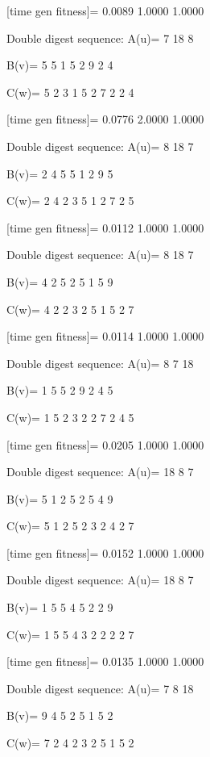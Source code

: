 [time gen fitness]=
    0.0089    1.0000    1.0000

Double digest sequence:
A(u)=
     7    18     8

B(v)=
     5     5     1     5     2     9     2     4

C(w)=
     5     2     3     1     5     2     7     2     2     4

[time gen fitness]=
    0.0776    2.0000    1.0000

Double digest sequence:
A(u)=
     8    18     7

B(v)=
     2     4     5     5     1     2     9     5

C(w)=
     2     4     2     3     5     1     2     7     2     5

[time gen fitness]=
    0.0112    1.0000    1.0000

Double digest sequence:
A(u)=
     8    18     7

B(v)=
     4     2     5     2     5     1     5     9

C(w)=
     4     2     2     3     2     5     1     5     2     7

[time gen fitness]=
    0.0114    1.0000    1.0000

Double digest sequence:
A(u)=
     8     7    18

B(v)=
     1     5     5     2     9     2     4     5

C(w)=
     1     5     2     3     2     2     7     2     4     5

[time gen fitness]=
    0.0205    1.0000    1.0000

Double digest sequence:
A(u)=
    18     8     7

B(v)=
     5     1     2     5     2     5     4     9

C(w)=
     5     1     2     5     2     3     2     4     2     7

[time gen fitness]=
    0.0152    1.0000    1.0000

Double digest sequence:
A(u)=
    18     8     7

B(v)=
     1     5     5     4     5     2     2     9

C(w)=
     1     5     5     4     3     2     2     2     2     7

[time gen fitness]=
    0.0135    1.0000    1.0000

Double digest sequence:
A(u)=
     7     8    18

B(v)=
     9     4     5     2     5     1     5     2

C(w)=
     7     2     4     2     3     2     5     1     5     2

